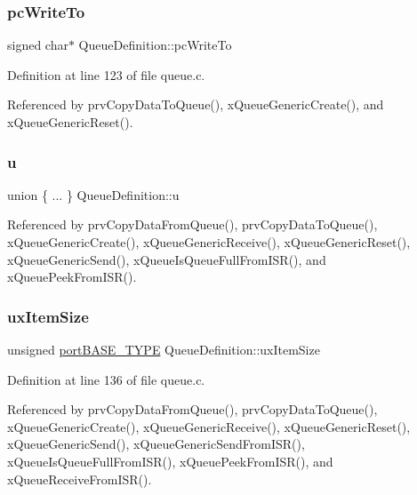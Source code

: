 \subsubsection{\texorpdfstring{pc\+Write\+To}{pcWriteTo}}
{\footnotesize\ttfamily signed char$\ast$ Queue\+Definition\+::pc\+Write\+To}



Definition at line 123 of file queue.\+c.



Referenced by prv\+Copy\+Data\+To\+Queue(), x\+Queue\+Generic\+Create(), and x\+Queue\+Generic\+Reset().

\mbox{\label{structQueueDefinition_ab2c557f3e7a58a29bd07c3c62e7e568a}} 
\subsubsection{\texorpdfstring{u}{u}}
{\footnotesize\ttfamily union \{ ... \}   Queue\+Definition\+::u}



Referenced by prv\+Copy\+Data\+From\+Queue(), prv\+Copy\+Data\+To\+Queue(), x\+Queue\+Generic\+Create(), x\+Queue\+Generic\+Receive(), x\+Queue\+Generic\+Reset(), x\+Queue\+Generic\+Send(), x\+Queue\+Is\+Queue\+Full\+From\+I\+S\+R(), and x\+Queue\+Peek\+From\+I\+S\+R().

\mbox{\label{structQueueDefinition_ad8719a7d6da96299b7ed158a621ae7e5}} 
\subsubsection{\texorpdfstring{ux\+Item\+Size}{uxItemSize}}
{\footnotesize\ttfamily unsigned \hyperlink{portmacro_8h_a1ebe82d24d764ae4e352f7c3a9f92c01}{port\+B\+A\+S\+E\+\_\+\+T\+Y\+PE} Queue\+Definition\+::ux\+Item\+Size}



Definition at line 136 of file queue.\+c.



Referenced by prv\+Copy\+Data\+From\+Queue(), prv\+Copy\+Data\+To\+Queue(), x\+Queue\+Generic\+Create(), x\+Queue\+Generic\+Receive(), x\+Queue\+Generic\+Reset(), x\+Queue\+Generic\+Send(), x\+Queue\+Generic\+Send\+From\+I\+S\+R(), x\+Queue\+Is\+Queue\+Full\+From\+I\+S\+R(), x\+Queue\+Peek\+From\+I\+S\+R(), and x\+Queue\+Receive\+From\+I\+S\+R().

